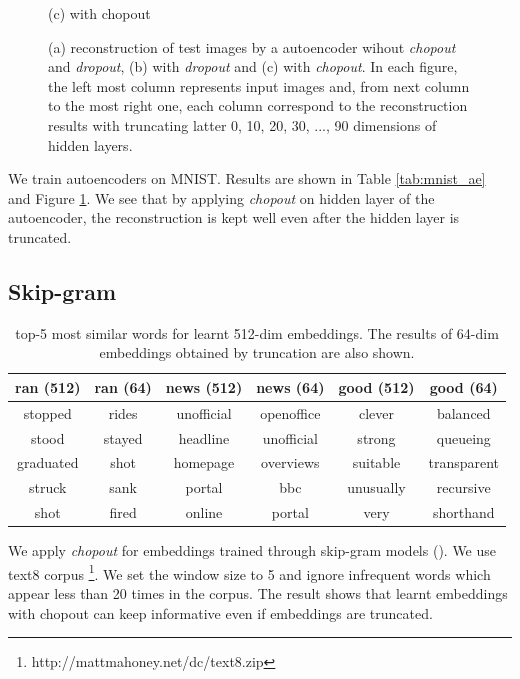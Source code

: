 \documentclass{article}
\begin{document}
\begin{figure}[h]
\begin{minipage}{0.33\linewidth}
\begin{center}
        \hspace{1.6cm} (c) with chopout
      \end{center}
    \end{minipage}    
    \caption{(a) reconstruction of test images by a autoencoder wihout \textit{chopout} and \textit{dropout}, (b) with \textit{dropout} and (c) with \textit{chopout}. 
    In each figure, the left most column represents input images and, from next column to the most right one, each column correspond to the reconstruction results with truncating latter 0, 10, 20, 30, ..., 90 dimensions of hidden layers.}
    \label{fig:mnist_ae}
    \end{figure}
    
    We train autoencoders on MNIST. Results are shown in Table \ref{tab:mnist_ae} and Figure \ref{fig:mnist_ae}. We see that by applying \textit{chopout} on hidden layer of the autoencoder, the reconstruction is kept well even after the hidden layer is truncated.
    
    \subsection{Skip-gram}
    
    \begin{table}[h]
        \caption{top-5 most similar words for learnt 512-dim embeddings. The results of 64-dim embeddings obtained by truncation are also shown.}    
        \centering
        \begin{tabular}{c|c|c|c|c|c}
            ran (512) & ran (64) & news (512) & news (64) & good (512) & good (64) \\ \hline \hline
            stopped & rides & unofficial & openoffice & clever & balanced \\
            stood & stayed & headline & unofficial & strong & queueing \\
            graduated & shot & homepage & overviews & suitable & transparent \\
            struck & sank & portal & bbc & unusually & recursive \\
            shot & fired & online & portal & very & shorthand \\
        \end{tabular}
        \label{tab:skip_gram}
    \end{table}    
    
    We apply \textit{chopout} for embeddings trained through skip-gram models (\citet{mikolov2013efficient, mikolov2013distributed}). We use text8 corpus \footnote{http://mattmahoney.net/dc/text8.zip}. We set the window size to 5 and ignore infrequent words which appear less than 20 times in the corpus. The result shows that learnt embeddings with chopout can keep informative even if embeddings are truncated.
\end{document}
